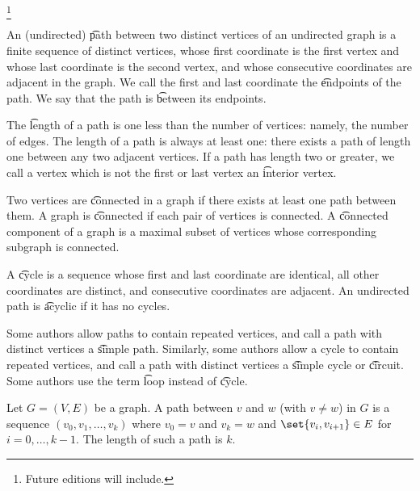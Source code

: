 
\footnote{Future editions will include.}


An (undirected) \t{path} between two distinct vertices of an undirected graph is a finite sequence of distinct vertices, whose first coordinate is the first vertex and whose last coordinate is the second vertex, and whose consecutive coordinates are adjacent in the graph.
We call the first and last coordinate the \t{endpoints} of the path.
We say that the path is \t{between} its endpoints.

The \t{length} of a path is one less than the number of vertices: namely, the number of edges.
The length of a path is always at least one: there exists a path of length one between any two adjacent vertices.
If a path has length two or greater, we call a vertex which is not the first or last vertex an \t{interior vertex}.

Two vertices are \t{connected} in a graph if there exists at least one path between them.
A graph is \t{connected} if each pair of vertices is connected.
A \t{connected component} of a graph is a maximal subset of vertices whose corresponding subgraph is connected.

A \t{cycle} is a sequence whose first and last coordinate are identical, all other coordinates are distinct, and consecutive coordinates are adjacent.
An undirected path is \t{acyclic} if it has no cycles.


Some authors allow paths to contain repeated vertices, and call a path with distinct vertices a \t{simple path}.
Similarly, some authors allow a cycle to contain repeated vertices, and call a path with distinct vertices a \t{simple cycle} or \t{circuit}.
Some authors use the term \t{loop} instead of \t{cycle}.


Let $G = (V, E)$ be a graph.
A path between $v$ and $w$ (with $v \neq w$) in $G$ is a sequence $(v_0, v_1, \dots, v_k)$ where $v_0 = v$ and $v_k = w$ and $\set{v_i, v_{i+1}} \in E$ for $i = 0, \dots, k-1$.
The length of such a path is $k$.
